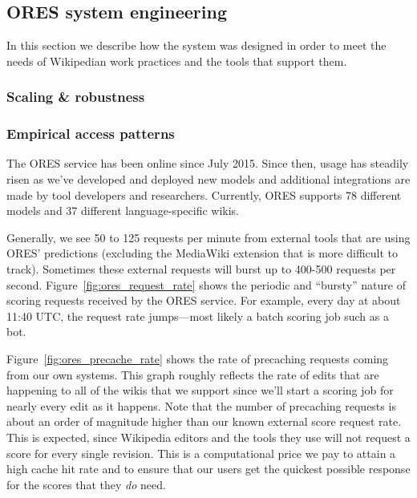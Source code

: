 \subsection{ORES system engineering}
\label{sec:ores_system_engineering}
In this section we describe how the system was designed in order to meet the needs of Wikipedian work practices and the tools that support them.

\subsubsection{Scaling \& robustness}


\subsubsection{Empirical access patterns}
\label{sec:appendix.empirical_access_patterns}


The ORES service has been online since July 2015\cite{halfaker2015artificial}.  Since then, usage has steadily risen as we've developed and deployed new models and additional integrations are made by tool developers and researchers.  Currently, ORES supports 78 different models and 37 different language-specific wikis.

Generally, we see 50 to 125 requests per minute from external tools that are using ORES' predictions (excluding the MediaWiki extension that is more difficult to track).  Sometimes these external requests will burst up to 400-500 requests per second.  Figure~\ref{fig:ores_request_rate} shows the periodic and ``bursty'' nature of scoring requests received by the ORES service.  For example, every day at about 11:40 UTC, the request rate jumps---most likely a batch scoring job such as a bot.

Figure~\ref{fig:ores_precache_rate} shows the rate of precaching requests coming from our own systems.  This graph roughly reflects the rate of edits that are happening to all of the wikis that we support since we'll start a scoring job for nearly every edit as it happens.  Note that the number of precaching requests is about an order of magnitude higher than our known external score request rate.  This is expected, since Wikipedia editors and the tools they use will not request a score for every single revision.  This is a computational price we pay to attain a high cache hit rate and to ensure that our users get the quickest possible response for the scores that they \emph{do} need.

